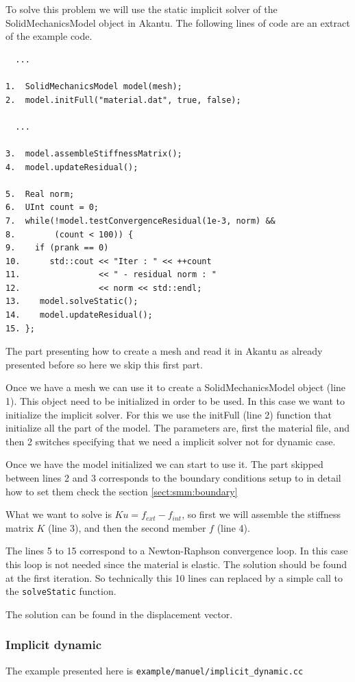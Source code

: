 \documentclass[a4paper,11pt]{book}
\newcommand{\code}[1]{{\tt{#1}}}
\begin{document}
To  solve  this  problem  we  will   use  the  static  implicit  solver  of  the
SolidMechanicsModel object in Akantu. The following lines of code are an extract
of the example code.

\begin{verbatim}
  ...

1.  SolidMechanicsModel model(mesh);
2.  model.initFull("material.dat", true, false);

  ...

3.  model.assembleStiffnessMatrix();
4.  model.updateResidual();

5.  Real norm;
6.  UInt count = 0;
7.  while(!model.testConvergenceResidual(1e-3, norm) &&
8.        (count < 100)) {
9.    if (prank == 0)
10.      std::cout << "Iter : " << ++count
11.                << " - residual norm : "
12.                << norm << std::endl;
13.    model.solveStatic();
14.    model.updateResidual();
15. };
\end{verbatim}

The  part presenting  how to  create a  mesh and  read it  in Akantu  as already
presented before so here we skip this first part.

Once we have a  mesh we can use it to create  a SolidMechanicsModel object (line
1). This object need to be initialized in order to be used. In this case we want
to  initialize the  implicit solver.   For  this we  use the  initFull (line  2)
function that  initialize all the part  of the model. The  parameters are, first
the material file, and then 2 switches specifying that we need a implicit solver
not for dynamic case.

Once we  have the model  initialized we  can start to  use it. The  part skipped
between lines 2 and 3 corresponds  to the boundary conditions setup to in detail
how to set them check the section \ref{sect:smm:boundary}

What we want to solve is $Ku = f_{ext} - f_{int}$, so first we will assemble the
stiffness matrix $K$ (line 3), and then the second member $f$ (line 4).

The lines 5 to 15 correspond  to a Newton-Raphson convergence loop. In this case
this loop  is not needed since the  material is elastic. The  solution should be
found at  the first iteration.  So technically this  10 lines can replaced  by a
simple call to the \code{solveStatic} function.

The solution can be found in the displacement vector.


\subsubsection{Implicit dynamic}
The example presented here is \code{example/manuel/implicit\_dynamic.cc}
\end{document}
